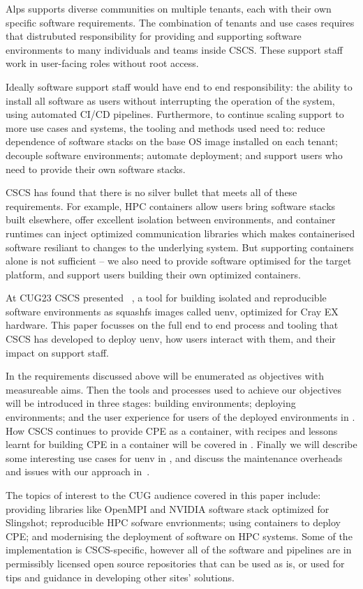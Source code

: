 Alps supports diverse communities on multiple tenants, each with their own specific software requirements.
The combination of tenants and use cases requires that distrubuted responsibility for providing and supporting software environments to many individuals and teams inside CSCS.
These support staff work in user-facing roles without root access.

Ideally software support staff would have end to end responsibility: the ability to install all software as users without interrupting the operation of the system, using automated CI/CD pipelines.
Furthermore, to continue scaling support to more use cases and systems, the tooling and methods used need to: reduce dependence of software stacks on the base OS image installed on each tenant; decouple software environments; automate deployment; and support users who need to provide their own software stacks.

CSCS has found that there is no silver bullet that meets all of these requirements.
For example, HPC containers allow users bring software stacks built elsewhere, offer excellent isolation between environments, and container runtimes can inject optimized communication libraries which makes containerised software resiliant to changes to the underlying system.
But supporting containers alone is not sufficient -- we also need to provide software optimised for the target platform, and support users building their own optimized containers.

At CUG23 CSCS presented \stackinator~\cite{uenv2023}, a tool for building isolated and reproducible software environments as squashfs images called uenv, optimized for Cray EX hardware.
This paper focusses on the full end to end process and tooling that CSCS has developed to deploy uenv, how users interact with them, and their impact on support staff.

In  the requirements discussed above will be enumerated as objectives with measureable aims.
Then the tools and processes used to achieve our objectives will be introduced in three stages: building environments; deploying environments; and the user experience for users of the deployed environments in .
How CSCS continues to provide CPE as a container, with recipes and lessons learnt for building CPE in a container will be covered in .
Finally we will describe some interesting use cases for uenv in , and discuss the maintenance overheads and issues with our approach in~.

The topics of interest to the CUG audience covered in this paper include: providing libraries like OpenMPI and NVIDIA software stack optimized for Slingshot; reproducible HPC sofware envrionments; using containers to deploy CPE; and modernising the deployment of software on HPC systems.
Some of the implementation is CSCS-specific, however all of the software and pipelines are in permissibly licensed open source repositories that can be used as is, or used for tips and guidance in developing other sites' solutions.

